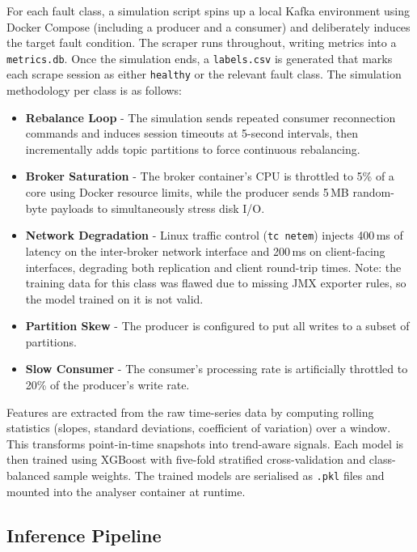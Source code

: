 \documentclass[12pt, a4paper]{article}
\begin{document}
For each fault class, a simulation script spins up a local Kafka environment
using Docker Compose (including a producer and a consumer) and deliberately
induces the target fault condition. The scraper runs throughout, writing metrics
into a \texttt{metrics.db}. Once the simulation ends, a \texttt{labels.csv} is
generated that marks each scrape session as either \texttt{healthy} or the
relevant fault class. The simulation methodology per class is as follows:

\begin{itemize}
    \item \textbf{Rebalance Loop} - The simulation sends repeated consumer
          reconnection commands and induces session timeouts at 5-second
          intervals, then incrementally adds topic partitions to force
          continuous rebalancing.
    \item \textbf{Broker Saturation} - The broker container's CPU is throttled
          to 5\% of a core using Docker resource limits, while the producer
          sends 5\,MB random-byte payloads to simultaneously stress disk I/O.
    \item \textbf{Network Degradation} - Linux traffic control (\texttt{tc
          netem}) injects 400\,ms of latency on the inter-broker network
          interface and 200\,ms on client-facing interfaces, degrading both
          replication and client round-trip times. Note: the training data for 
          this class was flawed due to missing JMX exporter rules, so the model 
          trained on it is not valid.
    \item \textbf{Partition Skew} - The producer is configured to put all
          writes to a subset of partitions.
    \item \textbf{Slow Consumer} - The consumer's processing rate is
          artificially throttled to 20\% of the producer's write rate.
\end{itemize}

Features are extracted from the raw time-series data by computing rolling
statistics (slopes, standard deviations, coefficient of variation) over a
window. This transforms point-in-time snapshots into trend-aware
signals. Each model is then trained using XGBoost with five-fold stratified
cross-validation and class-balanced sample weights. The trained models are
serialised as \texttt{.pkl} files and mounted into the analyser container at
runtime.

\subsection{Inference Pipeline}
\end{document}
